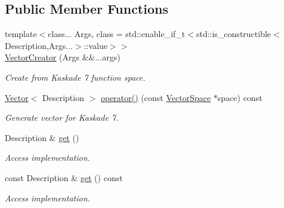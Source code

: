 \subsection*{Public Member Functions}
\begin{DoxyCompactItemize}
\item 
{\footnotesize template$<$class... Args, class  = std\+::enable\+\_\+if\+\_\+t$<$std\+::is\+\_\+constructible$<$\+Description,\+Args...$>$\+::value$>$$>$ }\\\hyperlink{group__VectorSpaceGroup_ga89de372343310640870077e6167df3f4}{Vector\+Creator} (Args \&\&...args)
\begin{DoxyCompactList}\small\item\em Create from Kaskade 7 function space. \end{DoxyCompactList}\item 
\hyperlink{classSpacy_1_1Kaskade_1_1Vector}{Vector}$<$ Description $>$ \hyperlink{classSpacy_1_1Kaskade_1_1VectorCreator_aaceaab9c73fe2738c9f32eae99953f97}{operator()} (const \hyperlink{classSpacy_1_1VectorSpace}{Vector\+Space} $\ast$space) const \hypertarget{classSpacy_1_1Kaskade_1_1VectorCreator_aaceaab9c73fe2738c9f32eae99953f97}{}\label{classSpacy_1_1Kaskade_1_1VectorCreator_aaceaab9c73fe2738c9f32eae99953f97}

\begin{DoxyCompactList}\small\item\em Generate vector for Kaskade 7. \end{DoxyCompactList}\item 
Description \& \hyperlink{classSpacy_1_1Mixin_1_1Get_aaa3afedcb9b9e943f81d1686b70417db}{get} ()\hypertarget{classSpacy_1_1Mixin_1_1Get_aaa3afedcb9b9e943f81d1686b70417db}{}\label{classSpacy_1_1Mixin_1_1Get_aaa3afedcb9b9e943f81d1686b70417db}

\begin{DoxyCompactList}\small\item\em Access implementation. \end{DoxyCompactList}\item 
const Description \& \hyperlink{classSpacy_1_1Mixin_1_1Get_ab00e550fb3ac8208d0a25e17e705a9fc}{get} () const\hypertarget{classSpacy_1_1Mixin_1_1Get_ab00e550fb3ac8208d0a25e17e705a9fc}{}\label{classSpacy_1_1Mixin_1_1Get_ab00e550fb3ac8208d0a25e17e705a9fc}

\begin{DoxyCompactList}\small\item\em Access implementation. \end{DoxyCompactList}\end{DoxyCompactItemize}


